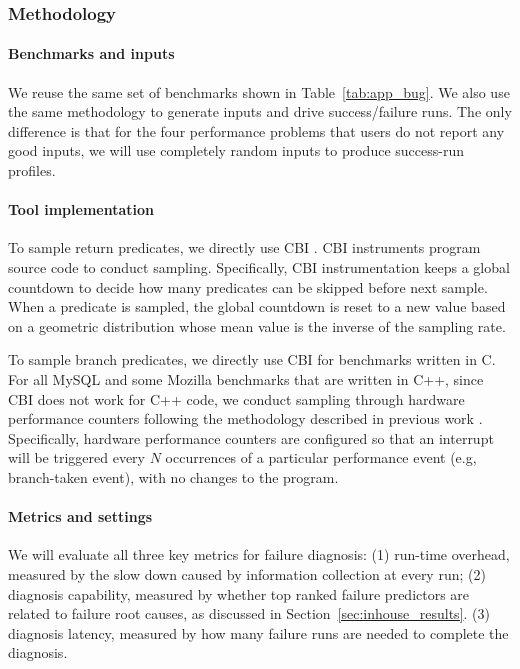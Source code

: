 \subsubsection{Methodology}
\paragraph{Benchmarks and inputs}
We reuse the same set of benchmarks shown in Table~\ref{tab:app_bug}. 
We also use the same methodology to generate inputs and drive success/failure
runs. The only difference is that for the four performance problems that users
do not report any good inputs, we will use completely random inputs to produce
success-run profiles.

\paragraph{Tool implementation}
To sample return predicates, we directly use CBI \cite{liblit03,liblit05}.
CBI instruments program source code to conduct sampling.
Specifically, CBI instrumentation keeps a global countdown to decide how many 
predicates can be skipped before next sample. 
When a predicate is sampled, 
the global countdown is reset to a new value based on a geometric distribution 
whose mean value is the inverse of the sampling rate. 

To sample branch predicates, we directly use CBI for benchmarks written in 
C. For all MySQL and some Mozilla benchmarks that are written in C++, since
CBI does not work for C++ code, we conduct sampling through
hardware performance counters following the
methodology described in previous work \cite{joy.asplos13}.
Specifically, hardware performance
counters are configured so that an interrupt will be triggered every $N$
occurrences of a particular performance event (e.g, branch-taken event), with no changes to the program.

\paragraph{Metrics and settings}
We will evaluate all three key metrics for failure diagnosis:
(1) run-time overhead, measured by the slow down caused by information
collection at every run;
(2) diagnosis capability,
measured by whether top ranked failure predictors are 
related to failure root causes, as discussed in 
Section~\ref{sec:inhouse_results}.
(3) diagnosis latency,
measured by how many failure runs are needed 
to complete the diagnosis. 

